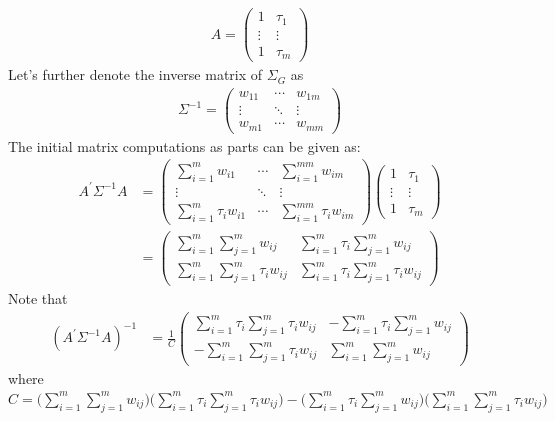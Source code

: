 \documentclass[12pt]{article}
\begin{document}
\begin{appendices}
\begin{equation}
\begin{split}
A =  
\begin{pmatrix}
1 & \tau_1 \\
\vdots & \vdots \\
1 & \tau_m
\end{pmatrix}
\end{split}
\end{equation}
Let's further denote the inverse matrix of $\Sigma_G$ as 
\begin{equation}
\begin{split}
\Sigma^{-1}=   
\begin{pmatrix}
w_{11} &  \cdots & w_{1m} \\
\vdots & \ddots & \vdots \\
w_{m1} &  \cdots & w_{mm}
\end{pmatrix}
\end{split}
\end{equation}
The initial matrix computations as parts can be given as: 
\begin{equation}
\begin{split}
A^{'}\Sigma^{-1}A &=   
\begin{pmatrix}
\sum_{i=1}^{m}w_{i1} &  \cdots & \sum_{i=1}^{mm}w_{im} \\
\vdots & \ddots & \vdots \\
\sum_{i=1}^{m} \tau_i w_{i1} &  \cdots & \sum_{i=1}^{mm} \tau_i w_{im}
\end{pmatrix}  
\begin{pmatrix}
1 &   \tau_1 \\
\vdots  & \vdots \\
1 &   \tau_m
\end{pmatrix} \\ &= 
\begin{pmatrix}
\sum_{i=1}^{m} \sum_{j=1}^{m} w_{ij} &   \sum_{i=1}^{m} \tau_i \sum_{j=1}^{m} w_{ij} \\
\sum_{i=1}^{m} \sum_{j=1}^{m} \tau_i w_{ij}  & \sum_{i=1}^{m}  \tau_i \sum_{j=1}^{m} \tau_i w_{ij} 
\end{pmatrix}  
\end{split}
\end{equation}
Note that 
\begin{equation}
\begin{split}
(A^{'}\Sigma^{-1}A)^{-1} &= \frac{1}{C}  
\begin{pmatrix}
\sum_{i=1}^{m}  \tau_i \sum_{j=1}^{m} \tau_i w_{ij} & - \sum_{i=1}^{m} \tau_i \sum_{j=1}^{m} w_{ij}\\
-\sum_{i=1}^{m} \sum_{j=1}^{m} \tau_i w_{ij} & \sum_{i=1}^{m} \sum_{j=1}^{m} w_{ij}
\end{pmatrix} 
\end{split}
\end{equation}
where $C = \big(\sum_{i=1}^{m} \sum_{j=1}^{m} w_{ij}\big) \big(\sum_{i=1}^{m}  \tau_i \sum_{j=1}^{m} \tau_i w_{ij}\big) - \big( \sum_{i=1}^{m} \tau_i \sum_{j=1}^{m} w_{ij}\big) \big(\sum_{i=1}^{m} \sum_{j=1}^{m} \tau_i w_{ij} \big)$


\end{appendices}
\end{document}
